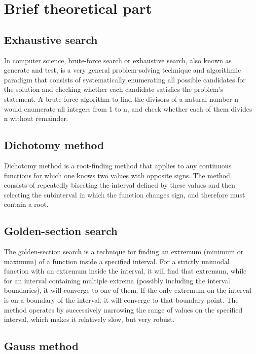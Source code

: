 \documentclass[a4paper,article,14pt]{extarticle}
\begin{document}
	\section{Brief theoretical part}
	\subsection{Exhaustive search}
	
	In computer science, brute-force search or exhaustive search, also known as generate and test, is a very general problem-solving technique and algorithmic paradigm that consists of systematically enumerating all possible candidates for the solution and checking whether each candidate satisfies the problem's statement. A brute-force algorithm to find the divisors of a natural number n would enumerate all integers from 1 to n, and check whether each of them divides n without remainder.
	
	\subsection{Dichotomy method}
	
	Dichotomy method is a root-finding method that applies to any continuous functions for which one knows two values with opposite signs. The method consists of repeatedly bisecting the interval defined by these values and then selecting the subinterval in which the function changes sign, and therefore must contain a root.
	
	\subsection{Golden-section search}
	
	The golden-section search is a technique for finding an extremum (minimum or maximum) of a function inside a specified interval. For a strictly unimodal function with an extremum inside the interval, it will find that extremum, while for an interval containing multiple extrema (possibly including the interval boundaries), it will converge to one of them. If the only extremum on the interval is on a boundary of the interval, it will converge to that boundary point. The method operates by successively narrowing the range of values on the specified interval, which makes it relatively slow, but very robust.
	
	\subsection{Gauss method}
	
\end{document}
